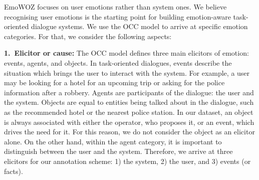 \documentclass[10pt, a4paper]{article}
\begin{document}

EmoWOZ focuses on user emotions rather than system ones. We believe recognising user emotions is the starting point for building emotion-aware task-oriented dialogue systems. We use the OCC model to arrive at specific emotion categories. For that, we consider the following aspects:

\textbf{1.\ Elicitor or cause:} The OCC model defines three main elicitors of emotion: events, agents, and objects. In task-oriented dialogues, events describe the situation which brings the user to interact with the system. For example, a user may be looking for a hotel for an upcoming trip or asking for the police information after a robbery. Agents are participants of the dialogue: the user and the system. Objects are equal to entities being talked about in the dialogue, such as the recommended hotel or the nearest police station. In our dataset, an object is always associated with either the operator, who proposes it, or an event, which drives the need for it. For this reason, we do not consider the object as an elicitor alone. On the other hand, within the agent category, it is important to distinguish between the user and the system. Therefore, we arrive at three elicitors for our annotation scheme: 1) the system, 2) the user, and 3) events (or facts).
\end{document}
